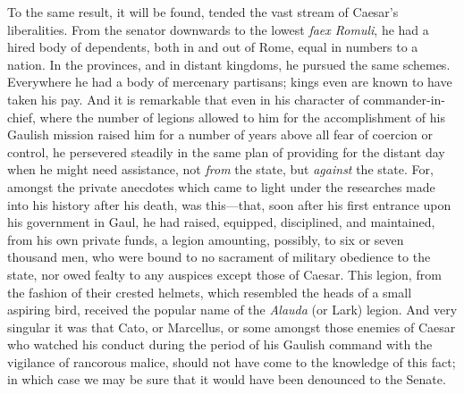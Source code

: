 To the same result, it will be found, tended the vast stream of Caesar's
liberalities. From the senator downwards to the lowest \emph{faex Romuli}, he
had a hired body of dependents, both in and out of Rome, equal in
numbers to a nation. In the provinces, and in distant kingdoms, he
pursued the same schemes. Everywhere he had a body of mercenary
partisans; kings even are known to have taken his pay. And it is
remarkable that even in his character of commander-in-chief, where the
number of legions allowed to him for the accomplishment of his Gaulish
mission raised him for a number of years above all fear of coercion or
control, he persevered steadily in the same plan of providing for the
distant day when he might need assistance, not \emph{from} the state, but
\emph{against} the state. For, amongst the private anecdotes which came to
light under the researches made into his history after his death, was
this—that, soon after his first entrance upon his government in Gaul,
he had raised, equipped, disciplined, and maintained, from his own
private funds, a legion amounting, possibly, to six or seven thousand
men, who were bound to no sacrament of military obedience to the state,
nor owed fealty to any auspices except those of Caesar. This legion,
from the fashion of their crested helmets, which resembled the heads of
a small aspiring bird, received the popular name of the \emph{Alauda} (or
Lark) legion. And very singular it was that Cato, or Marcellus, or some
amongst those enemies of Caesar who watched his conduct during the
period of his Gaulish command with the vigilance of rancorous malice,
should not have come to the knowledge of this fact; in which case we may
be sure that it would have been denounced to the Senate.

